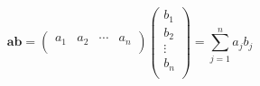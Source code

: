 \begin{equation*}
	\bm{a} \bm{b} =
	\begin{pmatrix}
		a_1 & a_2 & \cdots & a_n \\
	\end{pmatrix}
	\begin{pmatrix}
		b_1    \\
		b_2    \\
		\vdots \\
		b_n    \\
	\end{pmatrix}
	=
	\sum_{j=1}^{n} a_{j} b_{j}
\end{equation*}
